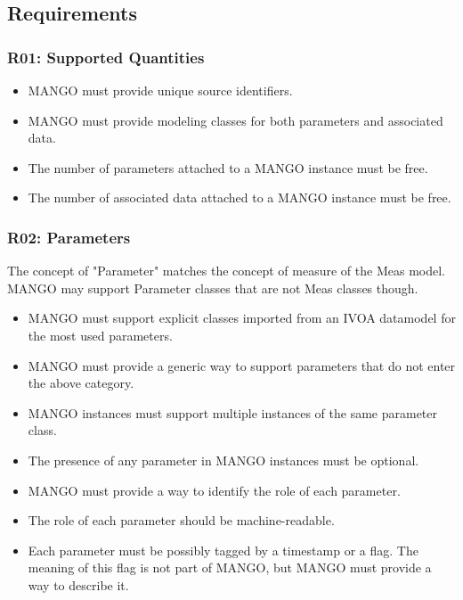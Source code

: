 \documentclass[11pt,a4paper]{ivoa}
\begin{document}
\subsection{Requirements}

\subsubsection{R01: Supported Quantities}
\begin{itemize}
    \item MANGO must provide unique source identifiers.
    \item MANGO must provide modeling classes for both parameters and associated data.
    \item The number of parameters attached to a MANGO instance must be free.
    \item The number of associated data attached to a MANGO instance must be free.
\end{itemize}

\subsubsection{R02: Parameters}
The concept of "Parameter" matches the concept of measure of the Meas model. MANGO may support Parameter classes that are not Meas classes though.


\begin{itemize}
    \item MANGO must support explicit classes imported from an IVOA datamodel for the most used parameters.
    \item MANGO must provide a generic way to support parameters that do not enter the above category.
    \item MANGO instances must support multiple instances of the same parameter class.
    \item The presence of any parameter in MANGO instances must be optional.
    \item MANGO must provide a way to identify the role of each parameter.
    \item The role of each parameter should be machine-readable.
    \item Each parameter must be possibly tagged by a timestamp or a flag. The meaning of this flag is not part of MANGO, but MANGO must provide a way to describe it.
\end{itemize}
\end{document}
